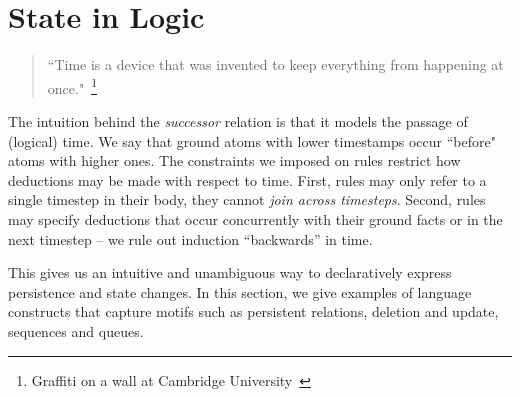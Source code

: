  \section{State in Logic}





\begin{quote}
``Time is a device that was invented to keep everything from happening at once."~\footnote{Graffiti on a wall at Cambridge University~\cite{scheme}}
\end{quote}

The intuition behind the \emph{successor} relation is that it models the
passage of (logical) time.  We say that ground atoms with lower timestamps
occur ``before" atoms with higher ones.
The constraints we imposed on \slang rules restrict how deductions may be made
with respect to time.  First, rules may only refer to a single timestep in
their body, they cannot {\em join across timesteps}.  Second, rules may specify
deductions that occur concurrently with their ground facts or in the next
timestep -- we rule out induction ``backwards'' in time.

This gives us an intuitive and unambiguous way to declaratively express persistence and state changes.  In this section, we 
give examples of language constructs that capture motifs such as persistent relations, deletion and update, sequences
and queues.

